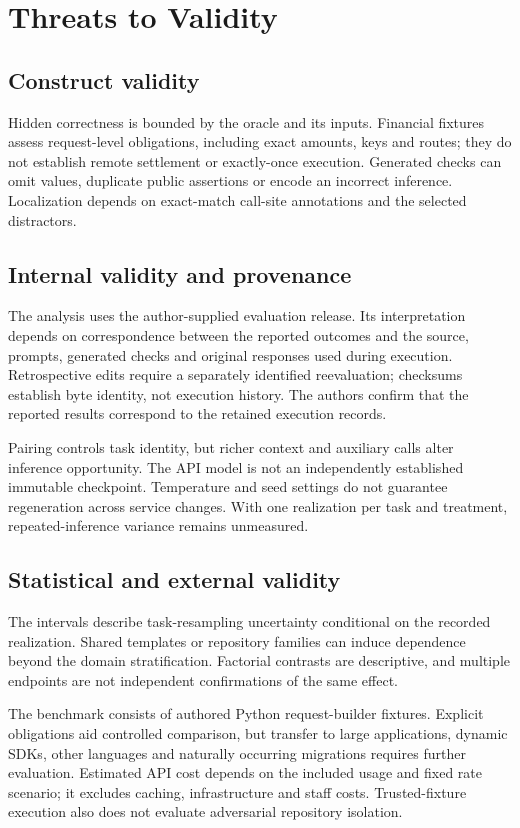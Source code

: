\section{Threats to Validity}
\subsection{Construct validity}
Hidden correctness is bounded by the oracle and its inputs. Financial fixtures assess request-level obligations, including exact amounts, keys and routes; they do not establish remote settlement or exactly-once execution. Generated checks can omit values, duplicate public assertions or encode an incorrect inference. Localization depends on exact-match call-site annotations and the selected distractors.

\subsection{Internal validity and provenance}
The analysis uses the author-supplied evaluation release. Its interpretation depends on correspondence between the reported outcomes and the source, prompts, generated checks and original responses used during execution. Retrospective edits require a separately identified reevaluation; checksums establish byte identity, not execution history. The authors confirm that the reported results correspond to the retained execution records.

Pairing controls task identity, but richer context and auxiliary calls alter inference opportunity. The API model is not an independently established immutable checkpoint. Temperature and seed settings do not guarantee regeneration across service changes. With one realization per task and treatment, repeated-inference variance remains unmeasured.

\subsection{Statistical and external validity}
The intervals describe task-resampling uncertainty conditional on the recorded realization. Shared templates or repository families can induce dependence beyond the domain stratification. Factorial contrasts are descriptive, and multiple endpoints are not independent confirmations of the same effect.

The benchmark consists of authored Python request-builder fixtures. Explicit obligations aid controlled comparison, but transfer to large applications, dynamic SDKs, other languages and naturally occurring migrations requires further evaluation. Estimated API cost depends on the included usage and fixed rate scenario; it excludes caching, infrastructure and staff costs. Trusted-fixture execution also does not evaluate adversarial repository isolation.


